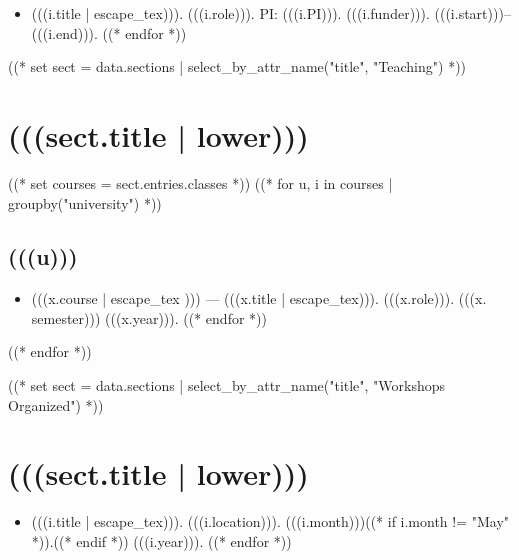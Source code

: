 \documentclass[11pt,article,oneside]{memoir}
\begin{document}
\mbox{}\vspace{-\dimexpr\baselineskip\relax}

\begin{itemize}[label={}]
((* for i in sect.entries.projects | sort_by_attr(["start"], reverse=True) *))
\item (((i.title | escape_tex))). (((i.role))). PI: (((i.PI))). (((i.funder))). (((i.start)))--(((i.end))).
((* endfor *))
\end{itemize}

((* set sect = data.sections | select_by_attr_name("title", "Teaching") *))
\section{(((sect.title | lower)))}

\mbox{}\vspace{-\dimexpr\baselineskip\relax}

\vspace{\baselineskip}

((* set courses = sect.entries.classes *))
((* for u, i in courses | groupby("university")  *))
\subsection{(((u)))}
\begin{itemize}[label={}]
((* for x in i | sort_last_year("year", reverse=True) *))
\item (((x.course | escape_tex ))) --- (((x.title | escape_tex))). (((x.role))). (((x. semester))) (((x.year))).
((* endfor *))
\end{itemize}
((* endfor *))

((* set sect = data.sections | select_by_attr_name("title", "Workshops Organized") *))
\section{(((sect.title | lower)))}

\mbox{}\vspace{-\dimexpr\baselineskip\relax}

\begin{itemize}[label={}]
((* for i in sect.entries.workshops | sort_last_year("year", reverse=True) *))
\item (((i.title | escape_tex))). (((i.location))). (((i.month)))((* if i.month != "May" *)).((* endif *)) (((i.year))).
((* endfor *))
\end{itemize}
\end{document}
